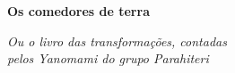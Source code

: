 

\thispagestyle{empty}






\begingroup\thispagestyle{empty}\vspace*{.05\textheight} 

              {\formular
              \huge
              \noindent
              \textbf{Os comedores de terra}\\ 
              
              \vspace{-0.5cm}
              
              }

              \vspace{0.5cm}

              \noindent{}\textit{Ou o livro das transformações, contadas\\pelos Yanomami do  grupo Parahiteri}
                    
\endgroup
\vfill
\pagebreak